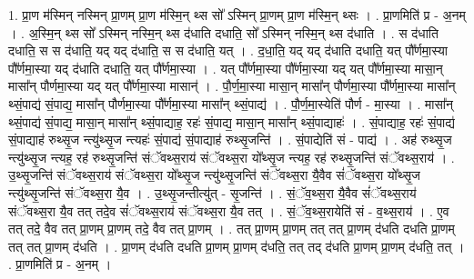 \documentclass[17pt]{extarticle}
\begin{document}
1. प्रा॒ण म॑स्मिन् नस्मिन् प्रा॒णम् प्रा॒ण म॑स्मि॒न् थ्स सो᳚ ऽस्मिन् प्रा॒णम् प्रा॒ण म॑स्मि॒न् थ्सः । . प्रा॒णमिति॑ प्र - अ॒नम् । . अ॒स्मि॒न् थ्स सो᳚ ऽस्मिन् नस्मि॒न् थ्स द॑धाति दधाति॒ सो᳚ ऽस्मिन् नस्मि॒न् थ्स द॑धाति । . स द॑धाति दधाति॒ स स द॑धाति॒ यद् यद् द॑धाति॒ स स द॑धाति॒ यत् । . द॒धा॒ति॒ यद् यद् द॑धाति दधाति॒ यत् पौ᳚र्णमा॒स्या पौ᳚र्णमा॒स्या यद् द॑धाति दधाति॒ यत् पौ᳚र्णमा॒स्या । . यत् पौ᳚र्णमा॒स्या पौ᳚र्णमा॒स्या यद् यत् पौ᳚र्णमा॒स्या मासा॒न् मासा᳚न् पौर्णमा॒स्या यद् यत् पौ᳚र्णमा॒स्या मासान्॑ । . पौ॒र्ण॒मा॒स्या मासा॒न् मासा᳚न् पौर्णमा॒स्या पौ᳚र्णमा॒स्या मासा᳚न् थ्सं॒पाद्य॑ सं॒पाद्य॒ मासा᳚न् पौर्णमा॒स्या पौ᳚र्णमा॒स्या मासा᳚न् थ्सं॒पाद्य॑ । . पौ॒र्ण॒मा॒स्येति॑ पौर्ण - मा॒स्या । . मासा᳚न् थ्सं॒पाद्य॑ सं॒पाद्य॒ मासा॒न् मासा᳚न् थ्सं॒पाद्याह॒ रहः॑ सं॒पाद्य॒ मासा॒न् मासा᳚न् थ्सं॒पाद्याहः॑ । . सं॒पाद्याह॒ रहः॑ सं॒पाद्य॑ सं॒पाद्याह॑ रुथ्सृ॒ज न्त्यु॑थ्सृ॒ज न्त्यहः॑ सं॒पाद्य॑ सं॒पाद्याह॑ रुथ्सृ॒जन्ति॑ । . सं॒पाद्येति॑ सं - पाद्य॑ । . अह॑ रुथ्सृ॒ज न्त्यु॑थ्सृ॒ज न्त्यह॒ रह॑ रुथ्सृ॒जन्ति॑ संॅवथ्स॒राय॑ संॅवथ्स॒रा यो᳚थ्सृ॒ज न्त्यह॒ रह॑ रुथ्सृ॒जन्ति॑ संॅवथ्स॒राय॑ । . उ॒थ्सृ॒जन्ति॑ संॅवथ्स॒राय॑ संॅवथ्स॒रा यो᳚थ्सृ॒ज न्त्यु॑थ्सृ॒जन्ति॑ संॅवथ्स॒रा यै॒वैव सं॑ॅवथ्स॒रा यो᳚थ्सृ॒ज न्त्यु॑थ्सृ॒जन्ति॑ संॅवथ्स॒रा यै॒व । . उ॒थ्सृ॒जन्तीत्यु॑त् - सृ॒जन्ति॑ । . सं॒ॅव॒थ्स॒रा यै॒वैव सं॑ॅवथ्स॒राय॑ संॅवथ्स॒रा यै॒व तत् तदे॒व सं॑ॅवथ्स॒राय॑ संॅवथ्स॒रा यै॒व तत् । . सं॒ॅव॒थ्स॒रायेति॑ सं - व॒थ्स॒राय॑ । . ए॒व तत् तदे॒ वैव तत् प्रा॒णम् प्रा॒णम् तदे॒ वैव तत् प्रा॒णम् । . तत् प्रा॒णम् प्रा॒णम् तत् तत् प्रा॒णम् द॑धति दधति प्रा॒णम् तत् तत् प्रा॒णम् द॑धति । . प्रा॒णम् द॑धति दधति प्रा॒णम् प्रा॒णम् द॑धति॒ तत् तद् द॑धति प्रा॒णम् प्रा॒णम् द॑धति॒ तत् । . प्रा॒णमिति॑ प्र - अ॒नम् । \newline
\end{document}
